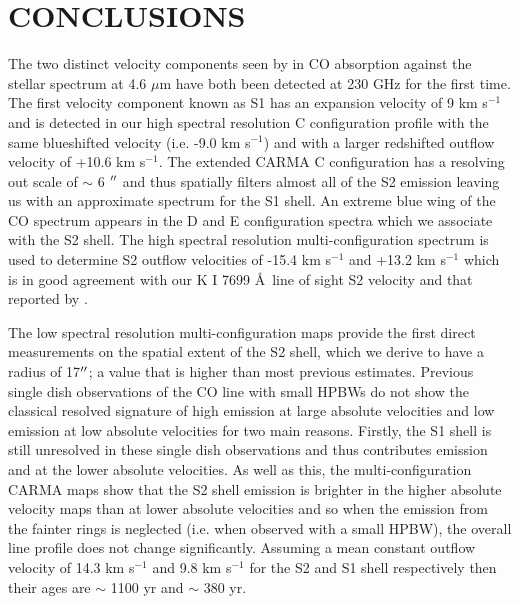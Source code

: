 \documentclass[iop]{emulateapj}
\begin{document}
\section{CONCLUSIONS}
The two distinct velocity components seen by \cite{1979ApJ...233L.135B} in CO absorption against the stellar spectrum at 4.6 $\mu$m have both been detected at 230 GHz for the first time. The first velocity component known as S1 has an expansion velocity of 9 km s${}^{-1}$ \citep{1979ApJ...233L.135B} and is detected in our high spectral resolution C configuration profile with the same blueshifted velocity (i.e. -9.0 km s${}^{-1}$) and with a larger redshifted outflow velocity of +10.6 km s${}^{-1}$. The extended CARMA C configuration has a resolving out scale of $\sim$ 6 $\mbox{$^{\prime\prime}$}$ and thus spatially filters almost all of the S2 emission leaving us with an approximate spectrum for the S1 shell. An extreme blue wing of the CO spectrum appears in the D and E configuration spectra which we associate with the S2 shell. The high spectral resolution multi-configuration spectrum is used to determine S2 outflow velocities of -15.4 km s${}^{-1}$ and +13.2 km s${}^{-1}$ which is in good agreement with our K I 7699 \AA \ line of sight S2 velocity and that reported by \cite{1979ApJ...233L.135B}. 

The low spectral resolution multi-configuration maps provide the first direct measurements on the spatial extent of the S2 shell, which we derive to have a radius of 17$\mbox{$^{\prime\prime}$}$; a value that is higher than most previous estimates. Previous single dish observations of the CO line with small HPBWs do not show the classical resolved  signature of high emission at large absolute velocities and low emission at low absolute velocities for two main reasons. Firstly, the S1 shell is still unresolved in these single dish observations and thus contributes emission and at the lower absolute velocities. As well as this, the multi-configuration CARMA maps show that the S2 shell emission is brighter in the higher absolute velocity maps than at lower absolute velocities and so when the emission from the fainter rings is neglected (i.e. when observed with a small HPBW), the overall line profile does not change significantly. Assuming a mean constant outflow velocity of 14.3 km s${}^{-1}$ and 9.8 km s${}^{-1}$ for the S2 and S1 shell respectively then their ages are $\sim$ 1100 yr and $\sim$ 380 yr. 

\acknowledgments
\end{document}
